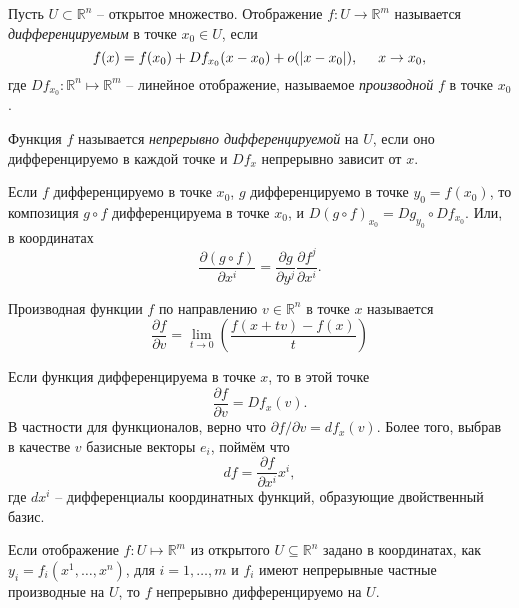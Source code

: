 \begin{to_def} 
    Пусть $U \subset \mathbb{R}^n$ -- открытое множество. Отображение $f \colon U \to \mathbb{R}^m$ называется \textit{дифференцируемым} в точке $x_0 \in U$, если
    \begin{equation*}
        f(x) = f(x_0) + Df_{x_0} (x - x_0) + o(|x-x_0|), \hspace{0.5cm} x \to x_0,
    \end{equation*} 
    где $Df_{x_0} \colon \mathbb{R}^n \mapsto \mathbb{R}^m$ -- линейное отображение, называемое \textit{производной} $f$ в точке $x_0$.  
\end{to_def}

\begin{to_def} 
    Функция $f$ называется \textit{непрерывно дифференцируемой} на $U$, если оно  дифференцируемо в каждой точке и $Df_x$ непрерывно зависит от $x$.
\end{to_def}

\begin{to_thr}
     Если $f$ дифференцируемо в точке $x_0$, $g$ дифференцируемо в точке $y_0 = f(x_0)$, то композиция $g \circ f$ дифференцируема в точке $x_0$, и $D(g \circ f)_{x_0} = Dg_{y_0} \circ Df_{x_0}$. Или, в координатах
     \begin{equation*}
         \frac{\partial (g \circ f)}{\partial x^i}  = \frac{\partial g}{\partial y^j} \frac{\partial f^j}{\partial x^i}.
     \end{equation*}
\end{to_thr}

\begin{to_def} 
    Производная функции $f$ по направлению $v \in \mathbb{R}^n$ в точке $x$ называется
    \begin{equation*}
         \frac{\partial f}{\partial v} = 
         \lim_{t \to 0}
         \left(\frac{f(x + t v) - f(x)}{t} \right)
     \end{equation*} 
\end{to_def}

\begin{to_lem} 
    Если функция дифференцируема в точке $x$, то в этой точке
    \begin{equation*}
         \frac{\partial f}{\partial v} = Df_x (v).
     \end{equation*} 
     В частности для функционалов, верно что $\partial f / \partial v = df_x (v)$. Более того, выбрав в качестве $v$ базисные векторы $e_i$, поймём что
     \begin{equation*}
         df = \frac{\partial f}{\partial x^i} x^i,
     \end{equation*}
     где $dx^i$ -- дифференциалы координатных функций, образующие двойственный базис.
\end{to_lem}

\begin{to_thr} 
    Если отображение $f \colon U \mapsto \mathbb{R}^m$ из открытого $U \subseteq \mathbb{R}^n$ задано в координатах, как $y_i = f_i(x^1, \ldots, x^n)$, для $i = 1,\ldots,m$ и  $f_i$ имеют непрерывные частные производные на $U$, то $f$ непрерывно дифференцируемо на $U$. 
\end{to_thr}

